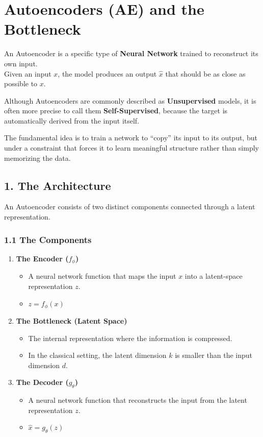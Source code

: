 \documentclass[
  italian,
  11pt,
]{article}
\begin{document}
\newpage

\section{Autoencoders (AE) and the
Bottleneck}\label{autoencoders-ae-and-the-bottleneck}

An Autoencoder is a specific type of \textbf{Neural Network} trained to
reconstruct its own input.\\
Given an input \(x\), the model produces an output \(\hat{x}\) that
should be as close as possible to \(x\).

Although Autoencoders are commonly described as \textbf{Unsupervised}
models, it is often more precise to call them \textbf{Self-Supervised},
because the target is automatically derived from the input itself.

The fundamental idea is to train a network to ``copy'' its input to its
output, but under a constraint that forces it to learn meaningful
structure rather than simply memorizing the data.

\subsection{1. The Architecture}\label{the-architecture-1}

An Autoencoder consists of two distinct components connected through a
latent representation.

\subsubsection{1.1 The Components}\label{the-components}

\begin{enumerate}
\def\labelenumi{\arabic{enumi}.}
\item
  \textbf{The Encoder (\(f_\phi\))}

  \begin{itemize}
  \item
    A neural network function that maps the input \(x\) into a
    latent-space representation \(z\).
  \item
    \(z = f_\phi(x)\)
  \end{itemize}
\item
  \textbf{The Bottleneck (Latent Space)}

  \begin{itemize}
  \item
    The internal representation where the information is compressed.
  \item
    In the classical setting, the latent dimension \(k\) is smaller than
    the input dimension \(d\).
  \end{itemize}
\item
  \textbf{The Decoder (\(g_\theta\))}

  \begin{itemize}
  \item
    A neural network function that reconstructs the input from the
    latent representation \(z\).
  \item
    \(\hat{x} = g_\theta(z)\)
  \end{itemize}
\end{enumerate}
\end{document}
